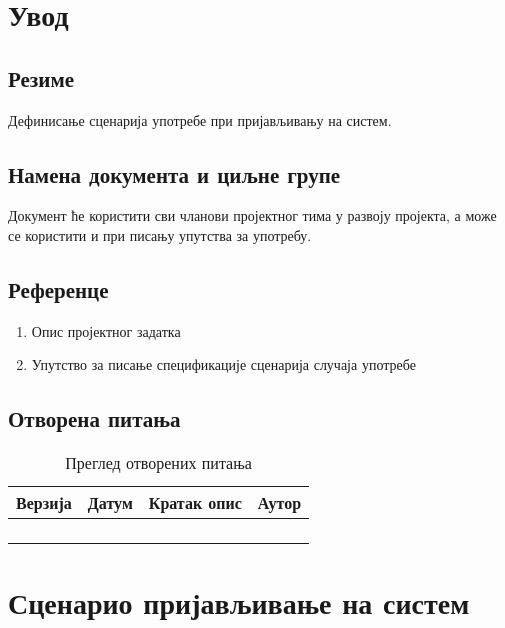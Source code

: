 \section{Увод}

\subsection{Резиме}
Дефинисање сценарија употребе при пријављивању на систем.

\subsection{Намена документа и циљне групе}
Документ ће користити сви чланови пројектног тима у развоју пројекта, а може се 
користити и при писању упутства за употребу.

\subsection{Референце}
\begin{enumerate}
	\item Опис пројектног задатка
	\item Упутство за писање спецификације сценарија случаја употребе
\end{enumerate}

\subsection{Отворена питања}
\begin{table}[h!]
\centering
	
	\begin{tabu}{ || X[l] | X[l] | X[l] | X[l] || }
	\hline
	\textbf{Верзија} & \textbf{Датум} & \textbf{Кратак опис} & \textbf{Аутор} \\
	\hline
	\hline
	& & &\\
	\hline
	& & &\\
	\hline
	& & &\\
	\hline
	& & &\\
	\hline
	\end{tabu}
	\caption{Преглед отворених питања}
	\label{table:2}
		
\end{table}



\section{Сценарио пријављивање на систем}

